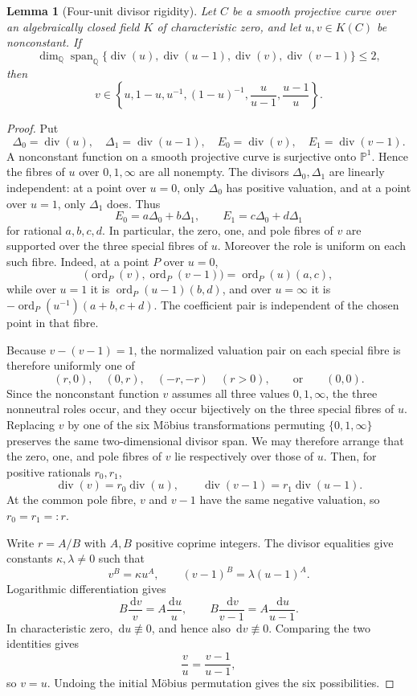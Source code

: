 \documentclass[11pt]{article}
\newtheorem{lemma}[theorem]{Lemma}
\theoremstyle{definition}
\newcommand{\Q}{\mathbb Q}
\newcommand{\ord}{\operatorname{ord}}
\newcommand{\dd}{\,\mathrm d}
\begin{document}
\begin{lemma}[Four-unit divisor rigidity]\label{lem:fourunit}
Let \(C\) be a smooth projective curve over an algebraically closed field
\(K\) of characteristic zero, and let \(u,v\in K(C)\) be nonconstant.
If
\[
 \dim_{\Q}\operatorname{span}_{\Q}
 \{\operatorname{div}(u),\operatorname{div}(u-1),
   \operatorname{div}(v),\operatorname{div}(v-1)\}\leq2,
\]
then
\[
 v\in
 \left\{u,1-u,u^{-1},(1-u)^{-1},
          \frac{u}{u-1},\frac{u-1}{u}\right\}.
\]
\end{lemma}

\begin{proof}
Put
\[
 \Delta_0=\operatorname{div}(u),\quad
 \Delta_1=\operatorname{div}(u-1),\quad
 E_0=\operatorname{div}(v),\quad
 E_1=\operatorname{div}(v-1).
\]
A nonconstant function on a smooth projective curve is surjective onto
\(\mathbb P^1\).  Hence the fibres of \(u\) over \(0,1,\infty\) are all
nonempty.  The divisors \(\Delta_0,\Delta_1\) are linearly independent:
at a point over \(u=0\), only \(\Delta_0\) has positive valuation, and at
a point over \(u=1\), only \(\Delta_1\) does.  Thus
\[
 E_0=a\Delta_0+b\Delta_1,
 \qquad
 E_1=c\Delta_0+d\Delta_1
\]
for rational \(a,b,c,d\).  In particular, the zero, one, and pole fibres of
\(v\) are supported over the three special fibres of \(u\).  Moreover the
role is uniform on each such fibre.  Indeed, at a point \(P\) over \(u=0\),
\[
 \bigl(\ord_P(v),\ord_P(v-1)\bigr)
 =\ord_P(u)(a,c),
\]
while over \(u=1\) it is \(\ord_P(u-1)(b,d)\), and over \(u=\infty\) it is
\(-\ord_P(u^{-1})(a+b,c+d)\).  The coefficient pair is independent of the
chosen point in that fibre.

Because \(v-(v-1)=1\), the normalized valuation pair on each special fibre
is therefore uniformly one of
\[
 (r,0),\quad(0,r),\quad(-r,-r)\quad(r>0),
 \qquad\text{or}\qquad(0,0).
\]
Since the nonconstant function \(v\) assumes all three values
\(0,1,\infty\), the three nonneutral roles occur, and they occur
bijectively on the three special fibres of \(u\).  Replacing \(v\) by one
of the six Möbius transformations permuting \(\{0,1,\infty\}\) preserves
the same two-dimensional divisor span.  We may therefore arrange that the
zero, one, and pole fibres of \(v\) lie respectively over those of \(u\).
Then, for positive rationals \(r_0,r_1\),
\[
 \operatorname{div}(v)=r_0\operatorname{div}(u),
 \qquad
 \operatorname{div}(v-1)=r_1\operatorname{div}(u-1).
\]
At the common pole fibre, \(v\) and \(v-1\) have the same negative
valuation, so \(r_0=r_1=:r\).

Write \(r=A/B\) with \(A,B\) positive coprime integers.  The divisor
equalities give constants \(\kappa,\lambda\neq0\) such that
\[
 v^B=\kappa u^A,
 \qquad
 (v-1)^B=\lambda(u-1)^A.
\]
Logarithmic differentiation gives
\[
 B\frac{\dd v}{v}=A\frac{\dd u}{u},
 \qquad
 B\frac{\dd v}{v-1}=A\frac{\dd u}{u-1}.
\]
In characteristic zero, \(\dd u\not\equiv0\), and hence also
\(\dd v\not\equiv0\).  Comparing the two identities gives
\[
 \frac vu=\frac{v-1}{u-1},
\]
so \(v=u\).  Undoing the initial Möbius permutation gives the six
possibilities.
\end{proof}
\end{document}
